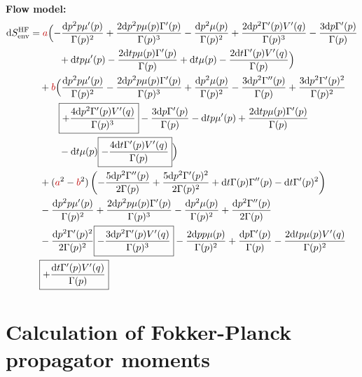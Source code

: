 %
\\
\textbf{Flow model:}
\begin{equation*}\begin{split}
	\d\SEnv^\HF &=
	{\color{red}a} \Bigl(-\frac{\d p^2 p \mu '(p)}{\Gamma (p)^2}+\frac{2 \d p^2 p \mu (p) \Gamma '(p)}{\Gamma (p)^3}-\frac{\d p^2 \mu (p)}{\Gamma (p)^2}+\frac{2 \d p^2 \Gamma '(p) V'(q)}{\Gamma (p)^3}-\frac{3 \d p \Gamma '(p)}{\Gamma (p)}
		\\&\quad\qquad
		+\d t p \mu '(p)-\frac{2 \d t p \mu (p) \Gamma '(p)}{\Gamma (p)}+\d t \mu (p)-\frac{2 \d t \Gamma '(p) V'(q)}{\Gamma (p)}\Bigr)
	\\&\quad
	+{\color{red}b} \Bigl(\frac{\d p^2 p \mu '(p)}{\Gamma (p)^2}-\frac{2 \d p^2 p \mu (p) \Gamma '(p)}{\Gamma (p)^3}+\frac{\d p^2 \mu (p)}{\Gamma (p)^2}-\frac{3 \d p^2 \Gamma ''(p)}{\Gamma (p)}+\frac{3 \d p^2 \Gamma '(p)^2}{\Gamma (p)^2}
		\\&\quad\qquad
		\boxed{+\frac{4 \d p^2 \Gamma '(p) V'(q)}{\Gamma (p)^3}}-\frac{3 \d p \Gamma '(p)}{\Gamma (p)}-\d t p \mu '(p)+\frac{2 \d t p \mu (p) \Gamma '(p)}{\Gamma (p)}
		\\&\quad\qquad
		-\d t \mu (p)\boxed{-\frac{4 \d t \Gamma '(p) V'(q)}{\Gamma (p)}}\Bigr)
	\\&\quad
	+({\color{red}a}^2-{\color{red}b}^2) \left(-\frac{5 \d p^2 \Gamma ''(p)}{2 \Gamma (p)}+\frac{5 \d p^2 \Gamma '(p)^2}{2 \Gamma (p)^2}+\d t \Gamma (p) \Gamma ''(p)-\d t \Gamma '(p)^2\right)
	\\&\quad
	-\frac{\d p^2 p \mu '(p)}{\Gamma (p)^2}+\frac{2 \d p^2 p \mu (p) \Gamma '(p)}{\Gamma (p)^3}-\frac{\d p^2 \mu (p)}{\Gamma (p)^2}+\frac{\d p^2 \Gamma ''(p)}{2 \Gamma (p)}
	\\&\quad
	-\frac{\d p^2 \Gamma '(p)^2}{2 \Gamma (p)^2}\boxed{-\frac{3 \d p^2 \Gamma '(p) V'(q)}{\Gamma (p)^3}}-\frac{2 \d p p \mu (p)}{\Gamma (p)^2}+\frac{\d p \Gamma '(p)}{\Gamma (p)}-\frac{2 \d t p \mu (p) V'(q)}{\Gamma (p)^2}
	\\&\quad
	\boxed{+\frac{\d t \Gamma '(p) V'(q)}{\Gamma (p)}}
\end{split}\end{equation*}

\section{Calculation of Fokker-Planck propagator moments}
\label{sec:fp moments}

